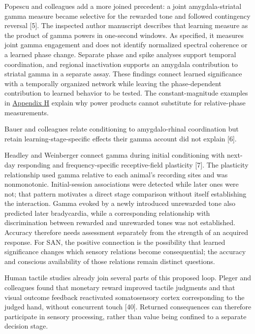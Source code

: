 \documentclass[
  american,
  11pt,
  letterpaper,
]{article}
\begin{document}
Popescu and colleagues add a more joined precedent: a joint amygdala-striatal gamma measure became selective for the rewarded tone and followed contingency reversal {[}5{]}. The inspected author manuscript describes that learning measure as the product of gamma powers in one-second windows. As specified, it measures joint gamma engagement and does not identify normalized spectral coherence or a learned phase change. Separate phase and spike analyses support temporal coordination, and regional inactivation supports an amygdala contribution to striatal gamma in a separate assay. These findings connect learned significance with a temporally organized network while leaving the phase-dependent contribution to learned behavior to be tested. The constant-magnitude examples in \href{https://zenodo.org/records/23455801/files/Learning-to-Feel-Technical-Supplement-v1.1.pdf\#appendix-h}{Appendix H} explain why power products cannot substitute for relative-phase measurements.

Bauer and colleagues relate conditioning to amygdalo-rhinal coordination but retain learning-stage-specific effects their gamma account did not explain {[}6{]}.

Headley and Weinberger connect gamma during initial conditioning with next-day responding and frequency-specific receptive-field plasticity {[}7{]}. The plasticity relationship used gamma relative to each animal's recording sites and was nonmonotonic. Initial-session associations were detected while later ones were not; that pattern motivates a direct stage comparison without itself establishing the interaction. Gamma evoked by a newly introduced unrewarded tone also predicted later bradycardia, while a corresponding relationship with discrimination between rewarded and unrewarded tones was not established. Accuracy therefore needs assessment separately from the strength of an acquired response. For SAN, the positive connection is the possibility that learned significance changes which sensory relations become consequential; the accuracy and conscious availability of those relations remain distinct questions.

Human tactile studies already join several parts of this proposed loop. Pleger and colleagues found that monetary reward improved tactile judgments and that visual outcome feedback reactivated somatosensory cortex corresponding to the judged hand, without concurrent touch {[}40{]}. Returned consequences can therefore participate in sensory processing, rather than value being confined to a separate decision stage.
\end{document}
